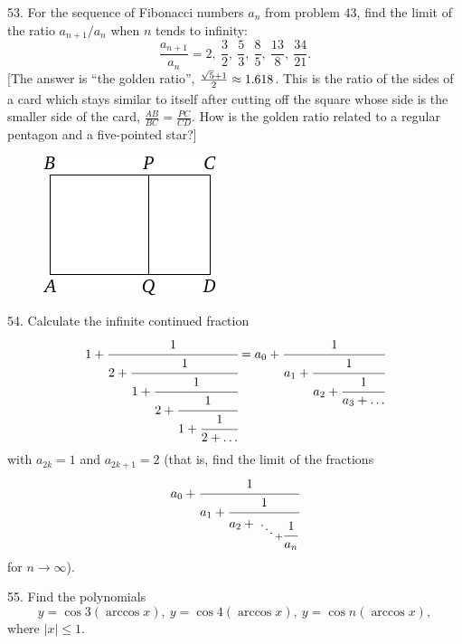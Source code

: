 \begin{problem}{53.}
	For the sequence of Fibonacci numbers $a_n$ from problem 43, find the limit of the ratio
	$a_{n+1}/a_n$ when $n$ tends to infinity:\vspace{2\jot}
	\begin{equation*}
		\frac{a_{n+1}}{a_n}=2,\ \frac 32,\ \frac53, \ \frac85, \ \frac{13}8,
		\ \frac{34}{21}.
	\end{equation*}
	[The answer is \enquote{the golden ratio},
	$\frac{\sqrt{5}+1}{2\vphantom)} \approx 1.618$. This is the ratio of the sides of a card which stays
	similar to itself after cutting off the square whose side is the smaller side of the card,
	$\frac{AB}{BC}=\frac{PC}{CD}$. How is the golden ratio related to a regular pentagon and a five-pointed star?]
	\begin{figure}
		\includegraphics{resources/taskbook-37}
	\end{figure}
\end{problem}

\begin{problem}{54.}
	Calculate the infinite continued fraction
	\begin{equation*}
		1+\cfrac{1}{2+\cfrac{1}{1+\cfrac{1}{2+\cfrac{1}{1+\cfrac{1}{2+\ldots}}}}}=
		a_0+\cfrac{1}{a_1+\cfrac{1}{a_2+\cfrac{1}{a_3+\dots}}}
	\end{equation*}
	with $a_{2k}=1$ and $a_{2k+1}=2$ (that is, find the limit of the fractions
	\begin{equation*}
		a_0+\cfrac{1}{a_1+\cfrac{1}{a_2+{\atop{\ddots \atop {}} + \cfrac{1}{a_n}}}}
	\end{equation*}
	for $n \to \infty$).
\end{problem}

\begin{problem}{55.}
	Find the polynomials
	\begin{equation*}
		y=\cos 3 (\arccos x),\ y=\cos 4 (\arccos x),\
		y=\cos n (\arccos x),
	\end{equation*}
	where $|x| \leqslant 1$.
\end{problem}

